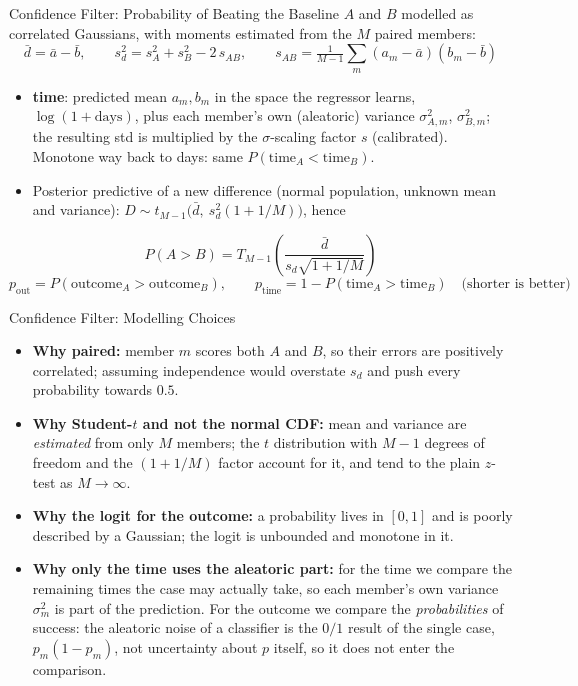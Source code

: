 \documentclass[aspectratio=169]{beamer} %
\begin{document}
\begin{frame}{Confidence Filter: Probability of Beating the Baseline}
  \footnotesize
  $A$ and $B$ modelled as \alert{correlated Gaussians}, with moments estimated from
  the $M$ paired members:
  \[
    \bar d = \bar a - \bar b, \qquad
    s_d^{2} = s_A^{2} + s_B^{2} - 2\, s_{AB}, \qquad
    s_{AB} = \tfrac{1}{M-1}\textstyle\sum_{m}(a_m-\bar a)(b_m-\bar b)
  \]
  \begin{itemize}
    \item \textbf{time}: predicted mean $a_m, b_m$ in the space the regressor learns, $\log(1+\text{days})$, plus each member's own (aleatoric) variance $\sigma^2_{A,m}$, $\sigma^2_{B,m}$; the resulting std is multiplied by the $\sigma$-scaling factor $s$ (calibrated). Monotone way back to days: same $P(\text{time}_A < \text{time}_B)$.

    \item Posterior predictive of a new difference (normal population, unknown mean
      and variance): $D \sim t_{M-1}\bigl(\bar d,\ s_d^2 (1 + 1/M)\bigr)$, hence
  \end{itemize}
  \[
    P(A > B) = T_{M-1}\!\left(\frac{\bar d}{s_d\sqrt{1 + 1/M}}\right)
  \]
  \vspace{-0.2cm}
  \[
    p_{\text{out}} = P(\text{outcome}_A > \text{outcome}_B), \qquad
    p_{\text{time}} = 1 - P(\text{time}_A > \text{time}_B) \quad \text{(shorter is better)}
  \]
\end{frame}

\begin{frame}{Confidence Filter: Modelling Choices}
  \begin{itemize}
    \item \textbf{Why paired:} member $m$ scores both $A$ and $B$, so their errors are
      positively correlated; assuming independence would overstate $s_d$ and push
      every probability towards $0.5$.
    \item \textbf{Why Student-$t$ and not the normal CDF:} mean and variance are
      \emph{estimated} from only $M$ members; the $t$ distribution with $M-1$ degrees
      of freedom and the $(1+1/M)$ factor account for it, and tend to the plain
      $z$-test as $M \to \infty$.
    \item \textbf{Why the logit for the outcome:} a probability lives in $[0,1]$ and is
      poorly described by a Gaussian; the logit is unbounded and monotone in it.
    \item \textbf{Why only the time uses the aleatoric part:} for the time we compare the remaining times the case may actually take, so each member's own variance $\sigma_m^2$ is part of the prediction. For the outcome we compare the \emph{probabilities} of success: the aleatoric noise of a classifier is the $0/1$ result of the single case, $p_m(1-p_m)$, not uncertainty about $p$ itself, so it does not enter the comparison.

  \end{itemize}
\end{frame}
\end{document}

